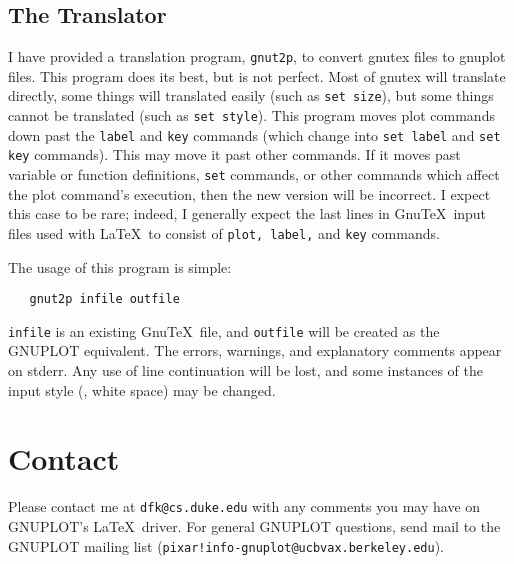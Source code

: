 \subsection{The Translator}
I have provided a translation program, {\tt gnut2p}, to convert gnutex
files to gnuplot files.  This program does its best, but is not
perfect. Most of gnutex will translate directly, some things will
translated easily (such as {\tt set size}), but some things cannot be
translated (such as {\tt set style}).  This program moves plot
commands down past the {\tt label} and {\tt key} commands (which
change into {\tt set label} and {\tt set key} commands). This may move
it past other commands. If it moves past variable or function
definitions, {\tt set} commands, or other commands which affect the
plot command's execution, then the new version will be incorrect. I
expect this case to be rare; indeed, I generally expect the last lines
in Gnu\TeX\ input files used with \LaTeX\ to consist of {\tt plot,
label,} and {\tt key} commands.

The usage of this program is simple: 
\begin{verbatim}
   gnut2p infile outfile
\end{verbatim}
{\tt infile} is an existing Gnu\TeX\ file, and {\tt outfile} will be
created as the GNUPLOT equivalent. The errors, warnings, and
explanatory comments appear on stderr. Any use of line continuation
will be lost, and some instances of the input style (\eg, white space)
may be changed.

\section{Contact}
Please contact me at \verb+dfk@cs.duke.edu+ with any comments you may
have on GNUPLOT's \LaTeX\ driver. For general GNUPLOT questions, send
mail to the GNUPLOT mailing list
(\verb+pixar!info-gnuplot@ucbvax.berkeley.edu+). 


